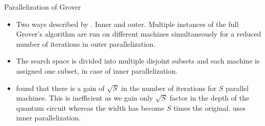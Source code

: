 \begin{frame}{Parallelization of Grover}
\begin{itemize}
    \item Two ways described by \cite{tsc}. Inner and outer. Multiple instances of the full Grover's algorithm are run on different machines simultaneously for a reduced number of iterations in outer parallelization.
    \pause
    \item The search space is divided into multiple disjoint subsets and each machine is assigned one subset, in case of inner parallelization.
    \pause
    \item \cite{zalka} found that there is a gain of $\sqrt{S}$ in the number of iterations for $S$ parallel machines. This is inefficient as we gain only $\sqrt{S}$ factor in the depth of the quantum circuit whereas the width has become $S$ times the original. \cite{aeslowmc} uses inner parallelization.
\end{itemize}
\end{frame}

